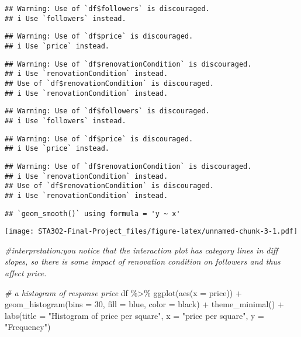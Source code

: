 \documentclass[
]{article}
\newenvironment{Shaded}{\begin{snugshade}}{\end{snugshade}}
\newcommand{\AttributeTok}[1]{\textcolor[rgb]{0.77,0.63,0.00}{#1}}
\newcommand{\CommentTok}[1]{\textcolor[rgb]{0.56,0.35,0.01}{\textit{#1}}}
\newcommand{\DecValTok}[1]{\textcolor[rgb]{0.00,0.00,0.81}{#1}}
\newcommand{\FunctionTok}[1]{\textcolor[rgb]{0.00,0.00,0.00}{#1}}
\newcommand{\NormalTok}[1]{#1}
\newcommand{\SpecialCharTok}[1]{\textcolor[rgb]{0.00,0.00,0.00}{#1}}
\newcommand{\StringTok}[1]{\textcolor[rgb]{0.31,0.60,0.02}{#1}}
\begin{document}
\begin{verbatim}
## Warning: Use of `df$followers` is discouraged.
## i Use `followers` instead.
\end{verbatim}

\begin{verbatim}
## Warning: Use of `df$price` is discouraged.
## i Use `price` instead.
\end{verbatim}

\begin{verbatim}
## Warning: Use of `df$renovationCondition` is discouraged.
## i Use `renovationCondition` instead.
## Use of `df$renovationCondition` is discouraged.
## i Use `renovationCondition` instead.
\end{verbatim}

\begin{verbatim}
## Warning: Use of `df$followers` is discouraged.
## i Use `followers` instead.
\end{verbatim}

\begin{verbatim}
## Warning: Use of `df$price` is discouraged.
## i Use `price` instead.
\end{verbatim}

\begin{verbatim}
## Warning: Use of `df$renovationCondition` is discouraged.
## i Use `renovationCondition` instead.
## Use of `df$renovationCondition` is discouraged.
## i Use `renovationCondition` instead.
\end{verbatim}

\begin{verbatim}
## `geom_smooth()` using formula = 'y ~ x'
\end{verbatim}

\texttt{[image: STA302-Final-Project\_files/figure-latex/unnamed-chunk-3-1.pdf]}

\begin{Shaded}
\begin{Highlighting}[]
\CommentTok{\#interpretation:you notice that the interaction plot has category lines in diff slopes, so there is some impact of renovation condition on followers and thus affect price.}

\CommentTok{\# a histogram of response price}
\NormalTok{df }\SpecialCharTok{\%\textgreater{}\%} \FunctionTok{ggplot}\NormalTok{(}\FunctionTok{aes}\NormalTok{(}\AttributeTok{x =}\NormalTok{ price)) }\SpecialCharTok{+} 
  \FunctionTok{geom\_histogram}\NormalTok{(}\AttributeTok{bins =} \DecValTok{30}\NormalTok{, }\AttributeTok{fill =} \StringTok{\textquotesingle{}blue\textquotesingle{}}\NormalTok{, }\AttributeTok{color =} \StringTok{\textquotesingle{}black\textquotesingle{}}\NormalTok{) }\SpecialCharTok{+}
  \FunctionTok{theme\_minimal}\NormalTok{() }\SpecialCharTok{+}
  \FunctionTok{labs}\NormalTok{(}\AttributeTok{title =} \StringTok{"Histogram of price per square"}\NormalTok{, }\AttributeTok{x =} \StringTok{"price per square"}\NormalTok{, }\AttributeTok{y =} \StringTok{"Frequency"}\NormalTok{)}
\end{Highlighting}
\end{Shaded}
\end{document}
